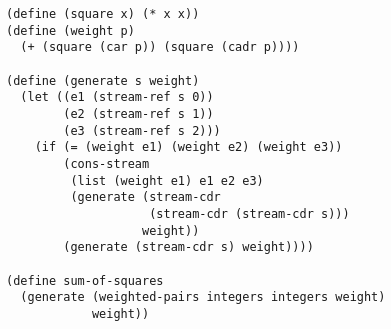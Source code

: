 \documentclass[a4paper,12pt]{article}
\begin{document}
\begin{lstlisting}
(define (square x) (* x x))
(define (weight p)
  (+ (square (car p)) (square (cadr p))))

(define (generate s weight)
  (let ((e1 (stream-ref s 0))
        (e2 (stream-ref s 1))
        (e3 (stream-ref s 2)))
    (if (= (weight e1) (weight e2) (weight e3))
        (cons-stream
         (list (weight e1) e1 e2 e3)
         (generate (stream-cdr
                    (stream-cdr (stream-cdr s)))
                   weight))
        (generate (stream-cdr s) weight))))

(define sum-of-squares
  (generate (weighted-pairs integers integers weight)
            weight))
\end{lstlisting}
\end{document}
